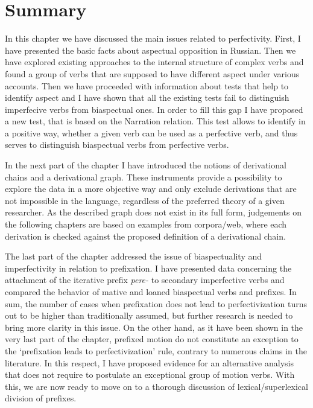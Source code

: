 \section{Summary}
In this chapter we have discussed the main issues related to perfectivity. First, I have presented the basic facts about aspectual opposition in Russian. Then we have explored existing approaches to the internal structure of complex verbs and found a group of verbs that are supposed to have different aspect under various accounts. Then we have proceeded with information about tests that help to identify aspect and I have shown that all the existing tests fail to distinguish imperfecive verbs from biaspectual ones. In order to fill this gap I have proposed a new test, that is based on the Narration relation. This test allows to identify in a positive way, whether a given verb can be used as a perfective verb, and thus serves to distinguish biaspectual verbs from perfective verbs.

In the next part of the chapter I have introduced the notions of derivational chains and a derivational graph. These instruments provide a possibility to explore the data in a more objective way and only exclude derivations that are not impossible in the language, regardless of the preferred theory of a given researcher. As the described graph does not exist in its full form, judgements on the following chapters are based on examples from corpora/web, where each derivation is checked against the proposed definition of a derivational chain.

The last part of the chapter addressed the issue of biaspectuality and imperfectivity in relation to prefixation. I have presented data concerning the attachment of the iterative prefix \textit{pere-} to secondary imperfective verbs and compared the behavior of mative and loaned biaspectual verbs and prefixes. In sum, the number of cases when prefixation does not lead to perfectivization turns out to be higher than traditionally assumed, but further research is needed to bring more clarity in this issue. On the other hand, as it have been shown in the very last part of the chapter, prefixed motion do not constitute an exception to the `prefixation leads to perfectivization' rule, contrary to numerous claims in the literature. In this respect, I have proposed evidence for an alternative analysis that does not require to postulate an exceptional group of motion verbs. With this, we are now ready to move on to a thorough discussion of lexical/superlexical division of prefixes.

